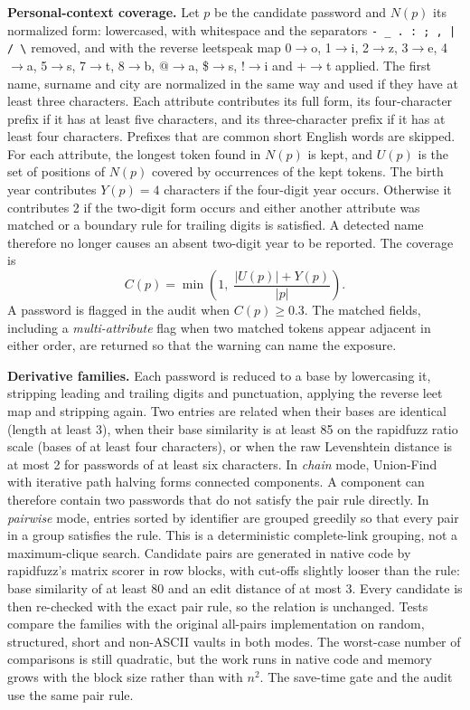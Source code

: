 \documentclass[conference]{IEEEtran}
\begin{document}
\textbf{Personal-context coverage.} Let $p$ be the candidate password and $N(p)$ its normalized form: lowercased, with whitespace and the separators \texttt{- \_ . : ; , | / \textbackslash} removed, and with the reverse leetspeak map 0$\to$o, 1$\to$i, 2$\to$z, 3$\to$e, 4$\to$a, 5$\to$s, 7$\to$t, 8$\to$b, @$\to$a, \$$\to$s, !$\to$i and +$\to$t applied. The first name, surname and city are normalized in the same way and used if they have at least three characters. Each attribute contributes its full form, its four-character prefix if it has at least five characters, and its three-character prefix if it has at least four characters. Prefixes that are common short English words are skipped. For each attribute, the longest token found in $N(p)$ is kept, and $U(p)$ is the set of positions of $N(p)$ covered by occurrences of the kept tokens. The birth year contributes $Y(p)=4$ characters if the four-digit year occurs. Otherwise it contributes 2 if the two-digit form occurs and either another attribute was matched or a boundary rule for trailing digits is satisfied. A detected name therefore no longer causes an absent two-digit year to be reported. The coverage is
\begin{equation}
C(p)=\min\!\left(1,\;\frac{|U(p)|+Y(p)}{|p|}\right).
\label{eq:cov}
\end{equation}
A password is flagged in the audit when $C(p)\geq 0.3$. The matched fields, including a \emph{multi-attribute} flag when two matched tokens appear adjacent in either order, are returned so that the warning can name the exposure.

\textbf{Derivative families.} Each password is reduced to a base by lowercasing it, stripping leading and trailing digits and punctuation, applying the reverse leet map and stripping again. Two entries are related when their bases are identical (length at least 3), when their base similarity is at least 85 on the rapidfuzz ratio scale (bases of at least four characters), or when the raw Levenshtein distance is at most 2 for passwords of at least six characters. In \emph{chain} mode, Union-Find with iterative path halving forms connected components. A component can therefore contain two passwords that do not satisfy the pair rule directly. In \emph{pairwise} mode, entries sorted by identifier are grouped greedily so that every pair in a group satisfies the rule. This is a deterministic complete-link grouping, not a maximum-clique search. Candidate pairs are generated in native code by rapidfuzz's matrix scorer in row blocks, with cut-offs slightly looser than the rule: base similarity of at least 80 and an edit distance of at most 3. Every candidate is then re-checked with the exact pair rule, so the relation is unchanged. Tests compare the families with the original all-pairs implementation on random, structured, short and non-ASCII vaults in both modes. The worst-case number of comparisons is still quadratic, but the work runs in native code and memory grows with the block size rather than with $n^2$. The save-time gate and the audit use the same pair rule.
\end{document}
